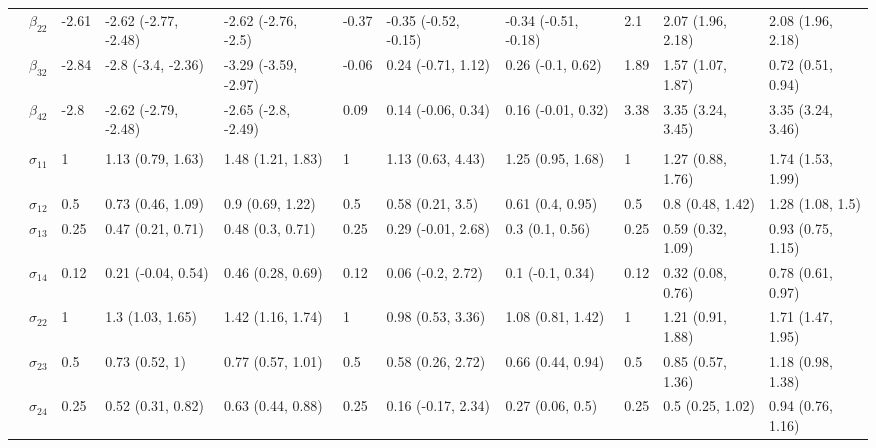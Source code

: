 \documentclass[]{article}
\begin{document}
\begin{landscape}
\begin{table}[t]
\begin{tabular}{lllllllllll}
\hspace{1em} & $\beta_{22}$ & -2.61 & -2.62 (-2.77, -2.48) & -2.62 (-2.76, -2.5) & -0.37 & -0.35 (-0.52, -0.15) & -0.34 (-0.51, -0.18) & 2.1 & 2.07 (1.96, 2.18) & 2.08 (1.96, 2.18)\\
\hspace{1em} & $\beta_{32}$ & -2.84 & -2.8 (-3.4, -2.36) & -3.29 (-3.59, -2.97) & -0.06 & 0.24 (-0.71, 1.12) & 0.26 (-0.1, 0.62) & 1.89 & 1.57 (1.07, 1.87) & 0.72 (0.51, 0.94)\\
\hspace{1em} & $\beta_{42}$ & -2.8 & -2.62 (-2.79, -2.48) & -2.65 (-2.8, -2.49) & 0.09 & 0.14 (-0.06, 0.34) & 0.16 (-0.01, 0.32) & 3.38 & 3.35 (3.24, 3.45) & 3.35 (3.24, 3.46)\\
\addlinespace[0.3em]
\multicolumn{11}{l}{\textbf{ }}\\
\hspace{1em} & $\sigma_{11}$ & 1 & 1.13 (0.79, 1.63) & 1.48 (1.21, 1.83) & 1 & 1.13 (0.63, 4.43) & 1.25 (0.95, 1.68) & 1 & 1.27 (0.88, 1.76) & 1.74 (1.53, 1.99)\\
\hspace{1em} & $\sigma_{12}$ & 0.5 & 0.73 (0.46, 1.09) & 0.9 (0.69, 1.22) & 0.5 & 0.58 (0.21, 3.5) & 0.61 (0.4, 0.95) & 0.5 & 0.8 (0.48, 1.42) & 1.28 (1.08, 1.5)\\
\hspace{1em} & $\sigma_{13}$ & 0.25 & 0.47 (0.21, 0.71) & 0.48 (0.3, 0.71) & 0.25 & 0.29 (-0.01, 2.68) & 0.3 (0.1, 0.56) & 0.25 & 0.59 (0.32, 1.09) & 0.93 (0.75, 1.15)\\
\hspace{1em} & $\sigma_{14}$ & 0.12 & 0.21 (-0.04, 0.54) & 0.46 (0.28, 0.69) & 0.12 & 0.06 (-0.2, 2.72) & 0.1 (-0.1, 0.34) & 0.12 & 0.32 (0.08, 0.76) & 0.78 (0.61, 0.97)\\
\hspace{1em} & $\sigma_{22}$ & 1 & 1.3 (1.03, 1.65) & 1.42 (1.16, 1.74) & 1 & 0.98 (0.53, 3.36) & 1.08 (0.81, 1.42) & 1 & 1.21 (0.91, 1.88) & 1.71 (1.47, 1.95)\\
\hspace{1em} & $\sigma_{23}$ & 0.5 & 0.73 (0.52, 1) & 0.77 (0.57, 1.01) & 0.5 & 0.58 (0.26, 2.72) & 0.66 (0.44, 0.94) & 0.5 & 0.85 (0.57, 1.36) & 1.18 (0.98, 1.38)\\
\hspace{1em} & $\sigma_{24}$ & 0.25 & 0.52 (0.31, 0.82) & 0.63 (0.44, 0.88) & 0.25 & 0.16 (-0.17, 2.34) & 0.27 (0.06, 0.5) & 0.25 & 0.5 (0.25, 1.02) & 0.94 (0.76, 1.16)\\

\end{tabular}
\end{table}
\end{landscape}
\end{document}
